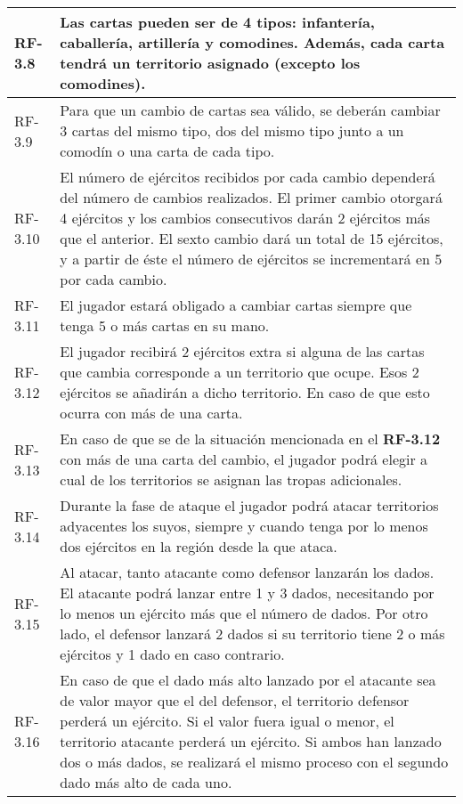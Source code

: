 \documentclass[11pt, a4paper, titlepage]{article}
\begin{document}
\begin{longtable}[h!]{| p{} | p{} |}
         \hline
         RF-3.8 & Las cartas pueden ser de 4 tipos: infantería, caballería, artillería y comodines.
         Además, cada carta tendrá un territorio asignado (excepto los comodines).\\
         \hline
         RF-3.9 & Para que un cambio de cartas sea válido, se deberán cambiar 3 cartas del mismo tipo, dos del mismo tipo junto a un comodín o una carta de cada tipo. \\
         \hline
         RF-3.10 & El número de ejércitos recibidos por cada cambio dependerá del número de cambios realizados. El primer cambio otorgará 4 ejércitos y los cambios consecutivos darán 2 ejércitos más que el anterior. El sexto cambio dará un total de 15 ejércitos, y a partir de éste el número de ejércitos se incrementará en 5 por cada cambio. \\
         \hline
         RF-3.11 & El jugador estará obligado a cambiar cartas siempre que tenga 5 o más cartas en su mano. \\
         \hline
         RF-3.12 & El jugador recibirá 2 ejércitos extra si alguna de las cartas que cambia corresponde a un territorio que ocupe. Esos 2 ejércitos se añadirán a dicho territorio. En caso de que esto ocurra con más de una carta. \\
         \hline
         RF-3.13 & En caso de que se de la situación mencionada en el \textbf{RF-3.12} con más de una carta del cambio, el jugador podrá elegir a cual de los territorios se asignan las tropas adicionales. \\
         \hline
         RF-3.14 & Durante la fase de ataque el jugador podrá atacar territorios adyacentes los suyos, siempre y cuando tenga por lo menos dos ejércitos en la región desde la que ataca.\\
         \hline
         RF-3.15 & Al atacar, tanto atacante como defensor lanzarán los dados. El atacante podrá lanzar entre 1 y 3 dados, necesitando por lo menos un ejército más que el número de dados. Por otro lado, el defensor lanzará 2 dados si su territorio tiene 2 o más ejércitos y 1 dado en caso contrario.\\
         \hline
         RF-3.16 & En caso de que el dado más alto lanzado por el atacante sea de valor mayor que el del defensor, el territorio defensor perderá un ejército. Si el valor fuera igual o menor, el territorio atacante perderá un ejército. Si ambos han lanzado dos o más dados, se realizará el mismo proceso con el segundo dado más alto de cada uno.\\
         \hline

\end{longtable}
\end{document}
